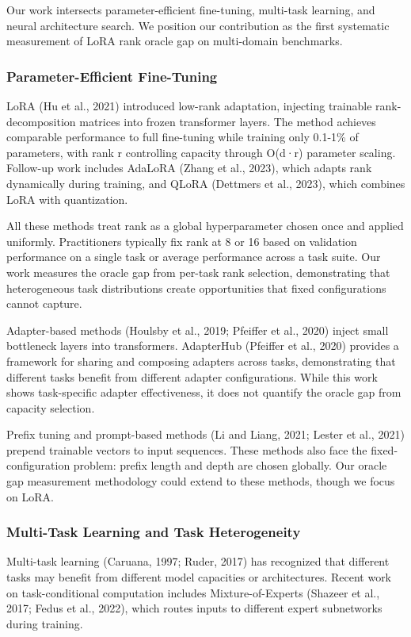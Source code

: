 
Our work intersects parameter-efficient fine-tuning, multi-task learning, and neural architecture search. We position our contribution as the first systematic measurement of LoRA rank oracle gap on multi-domain benchmarks.

\subsubsection{Parameter-Efficient Fine-Tuning}

LoRA (Hu et al., 2021) introduced low-rank adaptation, injecting trainable rank-decomposition matrices into frozen transformer layers. The method achieves comparable performance to full fine-tuning while training only 0.1-1\% of parameters, with rank r controlling capacity through O(d·r) parameter scaling. Follow-up work includes AdaLoRA (Zhang et al., 2023), which adapts rank dynamically during training, and QLoRA (Dettmers et al., 2023), which combines LoRA with quantization.

All these methods treat rank as a global hyperparameter chosen once and applied uniformly. Practitioners typically fix rank at 8 or 16 based on validation performance on a single task or average performance across a task suite. Our work measures the oracle gap from per-task rank selection, demonstrating that heterogeneous task distributions create opportunities that fixed configurations cannot capture.

Adapter-based methods (Houlsby et al., 2019; Pfeiffer et al., 2020) inject small bottleneck layers into transformers. AdapterHub (Pfeiffer et al., 2020) provides a framework for sharing and composing adapters across tasks, demonstrating that different tasks benefit from different adapter configurations. While this work shows task-specific adapter effectiveness, it does not quantify the oracle gap from capacity selection.

Prefix tuning and prompt-based methods (Li and Liang, 2021; Lester et al., 2021) prepend trainable vectors to input sequences. These methods also face the fixed-configuration problem: prefix length and depth are chosen globally. Our oracle gap measurement methodology could extend to these methods, though we focus on LoRA.

\subsubsection{Multi-Task Learning and Task Heterogeneity}

Multi-task learning (Caruana, 1997; Ruder, 2017) has recognized that different tasks may benefit from different model capacities or architectures. Recent work on task-conditional computation includes Mixture-of-Experts (Shazeer et al., 2017; Fedus et al., 2022), which routes inputs to different expert subnetworks during training.

